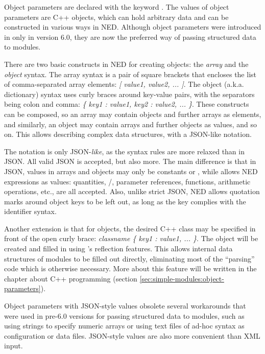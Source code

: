 Object parameters are declared with the keyword . The values of
object parameters are C++ objects, which can hold arbitrary data and can be
constructed in various ways in NED. Although object parameters were introduced
in {\opp} only in version 6.0, they are now the preferred way of passing
structured data to modules.

There are two basic constructs in NED for creating objects: the \textit{array}
and the \textit{object} syntax. The array syntax is a pair of square brackets
that encloses the list of comma-separated array elements: \textit{[ value1,
value2, ... ]}. The object (a.k.a. dictionary) syntax uses curly braces around
key-value pairs, with the separators being colon and comma: \textit{\{ key1 :
value1, key2 : value2, ... \}}. These constructs can be composed, so an array
may contain objects and further arrays as elements, and similarly, an object may
contain arrays and further objects as values, and so on. This allows describing
complex data structures, with a JSON-like notation.

The notation is only JSON-\textit{like}, as the syntax rules are more relaxed
than in JSON. All valid JSON is accepted, but also more. The main difference is
that in JSON, values in arrays and objects may only be constants or ,
while {\opp} allows NED expressions as values: quantities,
/, parameter references, functions, arithmetic
operations, etc., are all accepted. Also, unlike strict JSON, NED allows quotation
marks around object keys to be left out, as long as the key complies with
the identifier syntax.

Another extension is that for objects, the desired C++ class may be specified in
front of the open curly brace: \textit{classname \{ key1 : value1, ... \}}. The
object will be created and filled in using {\opp}'s reflection features. This
allows internal data structures of modules to be filled out directly,
eliminating most of the ``parsing'' code which is otherwise necessary. More about
this feature will be written in the chapter about C++ programming (section
\ref{sec:simple-modules:object-parameters}).

Object parameters with JSON-style values obsolete several workarounds that were
used in pre-6.0 {\opp} versions for passing structured data to modules, such as
using strings to specify numeric arrays or using text files of ad-hoc syntax as
configuration or data files. JSON-style values are also more convenient than XML
input.

